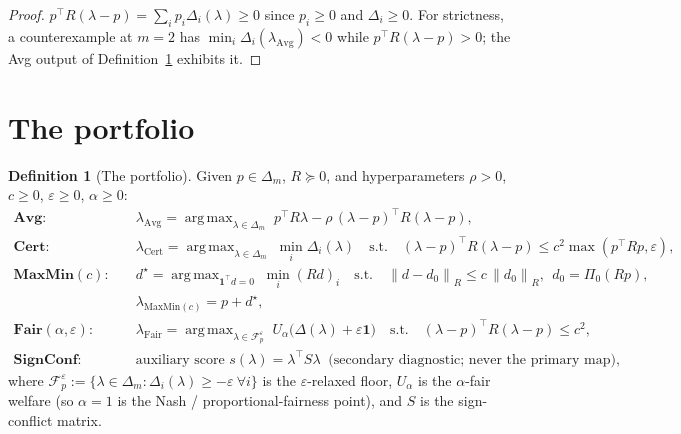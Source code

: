 \documentclass[12pt,a4paper]{report}
\newcommand{\1}{\mathbf{1}}
\newcommand{\norm}[1]{\left\lVert #1 \right\rVert}
\newcommand{\Floor}{\mathcal{F}_{p}}
\newcommand{\Pz}{\Pi_{0}}
\DeclareMathOperator*{\argmax}{arg\,max}
\theoremstyle{definition}
\newtheorem{definition}{Definition}
\begin{document}
\begin{proof}
\(p^\top R(\lambda-p)=\sum_i p_i\Delta_i(\lambda)\ge0\) since \(p_i\ge0\) and \(\Delta_i\ge0\). For strictness, a counterexample at \(m=2\) has \(\min_i\Delta_i(\lambda_{\mathrm{Avg}})<0\) while \(p^\top R(\lambda-p)>0\); the Avg output of Definition~\ref{def:portfolio} exhibits it.
\end{proof}

\section{The portfolio}
\label{sec:portfolio}

\begin{definition}[The portfolio]
\label{def:portfolio}
Given \(p\in\Delta_m\), \(R\succeq0\), and hyperparameters \(\rho>0\), \(c\ge0\), \(\varepsilon\ge0\), \(\alpha\ge0\):
\[
\begin{aligned}
\textbf{Avg}:\quad
&\lambda_{\mathrm{Avg}}=\argmax_{\lambda\in\Delta_m}\; p^\top R\lambda-\rho\,(\lambda-p)^\top R(\lambda-p),\\[2pt]
\textbf{Cert}:\quad
&\lambda_{\mathrm{Cert}}=\argmax_{\lambda\in\Delta_m}\;\min_i\Delta_i(\lambda)
\quad\text{s.t.}\quad (\lambda-p)^\top R(\lambda-p)\le c^2\max(p^\top Rp,\varepsilon),\\[2pt]
\textbf{MaxMin}(c):\quad
&d^\star=\argmax_{\1^\top d=0}\;\min_i (Rd)_i
\quad\text{s.t.}\quad \norm{d-d_0}_R\le c\,\norm{d_0}_R,\ \ d_0=\Pz(Rp),\\
&\lambda_{\mathrm{MaxMin}(c)}=p+d^\star,\\[2pt]
\textbf{Fair}(\alpha,\varepsilon):\quad
&\lambda_{\mathrm{Fair}}=\argmax_{\lambda\in\Floor^{\varepsilon}}\;U_\alpha\bigl(\Delta(\lambda)+\varepsilon\1\bigr)
\quad\text{s.t.}\quad (\lambda-p)^\top R(\lambda-p)\le c^2,\\[2pt]
\textbf{SignConf}:\quad
&\text{auxiliary score } s(\lambda)=\lambda^\top S\lambda \ \text{ (secondary diagnostic; never the primary map)},
\end{aligned}
\]
where \(\Floor^{\varepsilon}:=\{\lambda\in\Delta_m:\Delta_i(\lambda)\ge-\varepsilon\ \forall i\}\) is the \(\varepsilon\)-relaxed floor, \(U_\alpha\) is the \(\alpha\)-fair welfare (so \(\alpha=1\) is the Nash / proportional-fairness point), and \(S\) is the sign-conflict matrix.
\end{definition}
\end{document}
